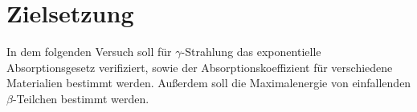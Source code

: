 \section{Zielsetzung}

\label{sec:Zielsetzung}
In dem folgenden Versuch soll für $\gamma$-Strahlung das exponentielle Absorptionsgesetz verifiziert, sowie der Absorptionskoeffizient
für verschiedene Materialien bestimmt werden. Außerdem soll die Maximalenergie von einfallenden $\beta$-Teilchen bestimmt werden.
